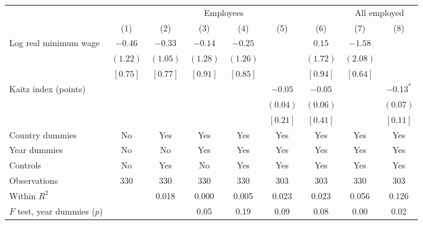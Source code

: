 \begin{tabular}{lcccccccc}
\toprule
 & \multicolumn{6}{c}{Employees} & \multicolumn{2}{c}{All employed} \\
\cmidrule(lr){2-7}\cmidrule(lr){8-9}
 & (1) & (2) & (3) & (4) & (5) & (6) & (7) & (8) \\
\midrule
Log real minimum wage & $-0.46$ & $-0.33$ & $-0.14$ & $-0.25$ &  & $0.15$ & $-1.58$ &  \\
 & $(1.22)$ & $(1.05)$ & $(1.28)$ & $(1.26)$ &  & $(1.72)$ & $(2.08)$ &  \\
 & $[0.75]$ & $[0.77]$ & $[0.91]$ & $[0.85]$ &  & $[0.94]$ & $[0.64]$ &  \\[2pt]
Kaitz index (points) &  &  &  &  & $-0.05$ & $-0.05$ &  & $-0.13^{*}$ \\
 &  &  &  &  & $(0.04)$ & $(0.06)$ &  & $(0.07)$ \\
 &  &  &  &  & $[0.21]$ & $[0.41]$ &  & $[0.11]$ \\[2pt]
\midrule
Country dummies & No & Yes & Yes & Yes & Yes & Yes & Yes & Yes \\
Year dummies & No & No & Yes & Yes & Yes & Yes & Yes & Yes \\
Controls & No & Yes & No & Yes & Yes & Yes & Yes & Yes \\
Observations & 330 & 330 & 330 & 330 & 303 & 303 & 330 & 303 \\
Within $R^2$ &  & 0.018 & 0.000 & 0.005 & 0.023 & 0.023 & 0.056 & 0.126 \\
$F$ test, year dummies ($p$) &  &  & 0.05 & 0.19 & 0.09 & 0.08 & 0.00 & 0.02 \\
\bottomrule
\end{tabular}
